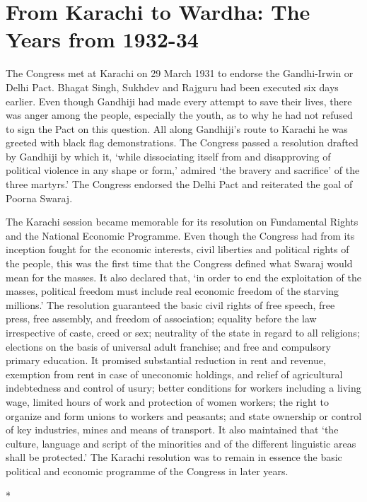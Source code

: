 \chapter{From Karachi to Wardha: The Years from 1932-34}\label{chapter:CH23}

The Congress met at Karachi on 29 March 1931 to endorse the Gandhi-Irwin or Delhi Pact. Bhagat Singh, Sukhdev and Rajguru had been executed six days earlier. Even though Gandhiji had made every attempt to save their lives, there was anger among the people, especially the youth, as to why he had not refused to sign the Pact on this question. All along Gandhiji's route to Karachi he was greeted with black flag demonstrations. The Congress passed a resolution drafted by Gandhiji by which it, `while dissociating itself from and disapproving of political violence in any shape or form,' admired `the bravery and sacrifice' of the three martyrs.' The Congress endorsed the Delhi Pact and reiterated the goal of Poorna Swaraj. 

The Karachi session became memorable for its resolution on Fundamental Rights and the National Economic Programme. Even though the Congress had from its inception fought for the economic interests, civil liberties and political rights of the people, this was the first time that the Congress defined what Swaraj would mean for the masses. It also declared that, `in order to end the exploitation of the masses, political freedom must include real economic freedom of the starving millions.' The resolution guaranteed the basic civil rights of free speech, free press, free assembly, and freedom of association; equality before the law irrespective of caste, creed or sex; neutrality of the state in regard to all religions; elections on the basis of universal adult franchise; and free and compulsory primary education. It promised substantial reduction in rent and revenue, exemption from rent in case of uneconomic holdings, and relief of agricultural indebtedness and control of usury; better conditions for workers including a living wage, limited hours of work and protection of women workers; the right to organize and form unions to workers and peasants; and state ownership or control of key industries, mines and means of transport. It also maintained that `the culture, language and script of the minorities and of the different linguistic areas shall be protected.' The Karachi resolution was to remain in essence the basic political and economic programme of the Congress in later years.

\begin{center}*\end{center}

